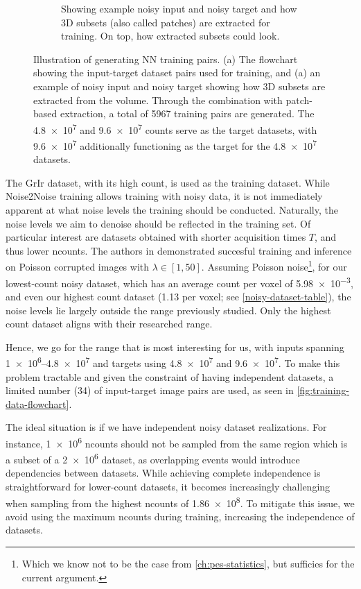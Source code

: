 \begin{figure}[h]
\begin{subfigure}[t]{0.39\linewidth}
        \caption{Showing example noisy input and noisy target and how 3D subsets (also called patches) are extracted for training. On top, how extracted subsets could look.}
        \label{fig:training-3d-patch-example}
    \end{subfigure}
    \caption{Illustration of generating \gls{NN} training pairs. (a) The flowchart showing the input-target dataset pairs used for training, and (a) an example of noisy input and noisy target showing how 3D subsets are extracted from the volume. Through the combination with patch-based extraction, a total of \num{5967} training pairs are generated. The \num{4.8e7} and \num{9.6e7} counts serve as the target datasets, with \num{9.6e7} additionally functioning as the target for the \num{4.8e7} datasets.}
\end{figure}
The \gls{GrIr} dataset, with its high count, is used as the training dataset. While Noise2Noise training allows training with noisy data, it is not immediately apparent at what noise levels the training should be conducted. Naturally, the noise levels we aim to denoise should be reflected in the training set. Of particular interest are datasets obtained with shorter acquisition times $T$, and thus lower \gls{ncounts}. The authors in \cite{lehtinenNoise2NoiseLearningImage2018} demonstrated succesful training and inference on Poisson corrupted images with $\lambda \in [1, 50]$. Assuming Poisson noise\footnote{Which we know not to be the case from \cref{ch:pes-statistics}, but 
sufficies for the current argument.}, for our lowest-count noisy dataset, which has an average count per voxel of \num{5.98e-3}, and even our highest count dataset (\num{1.13} per voxel; see \cref{noisy-dataset-table}), the noise levels lie largely outside the range previously studied. Only the highest count dataset aligns with their researched range.

Hence, we go for the range that is most interesting for us, with inputs spanning \numrange{1e6}{4.8e7} and targets using \num{4.8e7} and \num{9.6e7}. To make this problem tractable and given the constraint of having independent datasets, a limited number (\num{34}) of input-target image pairs are used, as seen in \cref{fig:training-data-flowchart}. 

The ideal situation is if we have independent noisy dataset realizations. For instance, \num{1e6} \gls{ncounts} should not be sampled from the same region which is a subset of a \num{2e6} dataset, as overlapping events would introduce dependencies between datasets. While achieving complete independence is straightforward for lower-count datasets, it becomes increasingly challenging when sampling from the highest \gls{ncounts} of \num{1.86e8}. To mitigate this issue, we avoid using the maximum \gls{ncounts} during training, increasing the independence of datasets. 

